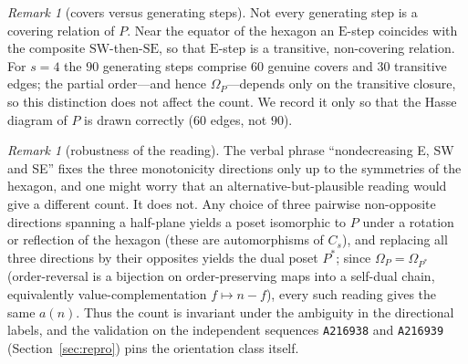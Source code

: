 \documentclass[11pt]{article}
\theoremstyle{plain}
\theoremstyle{definition}
\theoremstyle{remark}
\newtheorem{remark}[theorem]{Remark}
\newcommand{\OEIS}[1]{\texttt{#1}}
\newcommand{\Eseq}{\mathrm{E}}
\newcommand{\SW}{\mathrm{SW}}
\newcommand{\SE}{\mathrm{SE}}
\newcommand{\Om}{\Omega}
\begin{document}
\begin{remark}[covers versus generating steps]\label{rem:covers}
Not every generating step is a covering relation of $P$. Near the equator of the hexagon an
$\Eseq$-step coincides with the composite $\SW$-then-$\SE$, so that $\Eseq$-step is a
transitive, non-covering relation. For $s=4$ the $90$ generating steps comprise $60$ genuine
covers and $30$ transitive edges; the partial order---and hence $\Om_P$---depends only on the
transitive closure, so this distinction does not affect the count. We record it only so that
the Hasse diagram of $P$ is drawn correctly ($60$ edges, not $90$).
\end{remark}

\begin{remark}[robustness of the reading]\label{rem:symmetry}
The verbal phrase ``nondecreasing E, SW and SE'' fixes the three monotonicity directions only up
to the symmetries of the hexagon, and one might worry that an alternative-but-plausible reading
would give a different count. It does not. Any choice of three pairwise non-opposite directions
spanning a half-plane yields a poset isomorphic to $P$ under a rotation or reflection of the
hexagon (these are automorphisms of $C_s$), and replacing all three directions by their opposites
yields the dual poset $P^{*}$; since $\Om_P=\Om_{P^{*}}$ (order-reversal is a bijection on
order-preserving maps into a self-dual chain, equivalently value-complementation
$f\mapsto n-f$), every such reading gives the same $a(n)$. Thus the count is invariant under the
ambiguity in the directional labels, and the validation on the independent sequences \OEIS{A216938}
and \OEIS{A216939} (Section~\ref{sec:repro}) pins the orientation class itself.
\end{remark}
\end{document}
